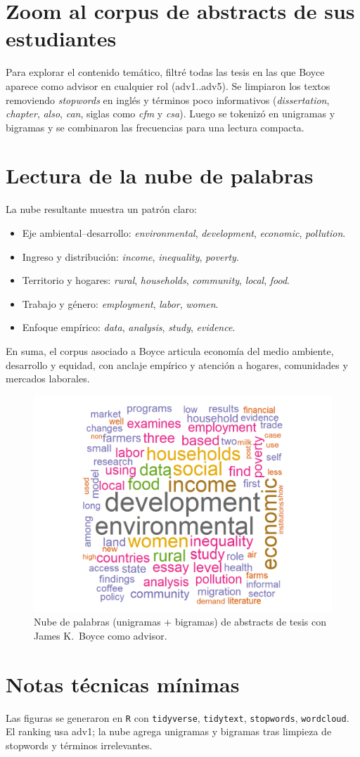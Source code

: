\documentclass[12pt]{article}
\begin{document}
	\section{Zoom al corpus de abstracts de sus estudiantes}
	Para explorar el contenido temático, filtré todas las tesis en las que Boyce aparece como advisor en cualquier rol (adv1..adv5). Se limpiaron los textos removiendo \textit{stopwords} en inglés y términos poco informativos (\textit{dissertation}, \textit{chapter}, \textit{also}, \textit{can}, siglas como \textit{cfm} y \textit{csa}). Luego se tokenizó en unigramas y bigramas y se combinaron las frecuencias para una lectura compacta.
	
	\section{Lectura de la nube de palabras}
	La nube resultante muestra un patrón claro:
	\begin{itemize}
		\item Eje ambiental--desarrollo: \textit{environmental}, \textit{development}, \textit{economic}, \textit{pollution}.
		\item Ingreso y distribución: \textit{income}, \textit{inequality}, \textit{poverty}.
		\item Territorio y hogares: \textit{rural}, \textit{households}, \textit{community}, \textit{local}, \textit{food}.
		\item Trabajo y género: \textit{employment}, \textit{labor}, \textit{women}.
		\item Enfoque empírico: \textit{data}, \textit{analysis}, \textit{study}, \textit{evidence}.
	\end{itemize}
	En suma, el corpus asociado a Boyce articula economía del medio ambiente, desarrollo y equidad, con anclaje empírico y atención a hogares, comunidades y mercados laborales.
	
	\begin{figure}[H]\centering
		\includegraphics[width=\linewidth]{wordcloud_boyce_unigrams_bigrams.png}
		\caption{Nube de palabras (unigramas + bigramas) de abstracts de tesis con James K.~Boyce como advisor.}
	\end{figure}
	
	\section*{Notas técnicas mínimas}
	Las figuras se generaron en \texttt{R} con \texttt{tidyverse}, \texttt{tidytext}, \texttt{stopwords}, \texttt{wordcloud}. El ranking usa adv1; la nube agrega unigramas y bigramas tras limpieza de stopwords y términos irrelevantes.
	
\end{document}
